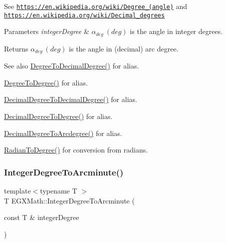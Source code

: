 See \href{https://en.wikipedia.org/wiki/Degree_(angle)}{\tt https\+://en.\+wikipedia.\+org/wiki/\+Degree\+\_\+(angle)} and \href{https://en.wikipedia.org/wiki/Decimal_degrees}{\tt https\+://en.\+wikipedia.\+org/wiki/\+Decimal\+\_\+degrees} 
\begin{DoxyParams}{Parameters}
{\em integer\+Degree} & $\alpha_{deg}\ (deg)$ is the angle in integer degrees. \\
\hline
\end{DoxyParams}
\begin{DoxyReturn}{Returns}
$\alpha_{deg}\ (deg)$ is the angle in (decimal) arc degree. 
\end{DoxyReturn}
\begin{DoxySeeAlso}{See also}
\mbox{\hyperlink{group___e_g_x_math-_angle_conversions-_degree_ga568afc1d436d425bf5d4edea584aee08}{Degree\+To\+Decimal\+Degree()}} for alias. 

\mbox{\hyperlink{group___e_g_x_math-_angle_conversions-_degree_gaca157e7d3e99a46a11a04b92680d2574}{Degree\+To\+Degree()}} for alias. 

\mbox{\hyperlink{group___e_g_x_math-_angle_conversions-_decimal_degree_gafccf9cd779903872887978ab9d79661f}{Decimal\+Degree\+To\+Decimal\+Degree()}} for alias. 

\mbox{\hyperlink{group___e_g_x_math-_angle_conversions-_decimal_degree_ga0aa7f2f5dbb00cf4ab303421c6e33ccf}{Decimal\+Degree\+To\+Degree()}} for alias. 

\mbox{\hyperlink{group___e_g_x_math-_angle_conversions-_decimal_degree_gacdd463fcabffeb598ebda65b012ce743}{Decimal\+Degree\+To\+Arcdegree()}} for alias. 

\mbox{\hyperlink{group___e_g_x_math-_angle_conversions-_radian_ga25bbce6cdc1c3621f2a158d320e3bc45}{Radian\+To\+Degree()}} for conversion from radians. 
\end{DoxySeeAlso}
\mbox{\label{group___e_g_x_math-_angle_conversions-_integer_degree_ga78b014e7649d666a3647c467e64e4fe8}} 
\subsubsection{\texorpdfstring{Integer\+Degree\+To\+Arcminute()}{IntegerDegreeToArcminute()}}
{\footnotesize\ttfamily template$<$typename T $>$ \\
T E\+G\+X\+Math\+::\+Integer\+Degree\+To\+Arcminute (\begin{DoxyParamCaption}\item[{const T \&}]{integer\+Degree }\end{DoxyParamCaption})}



